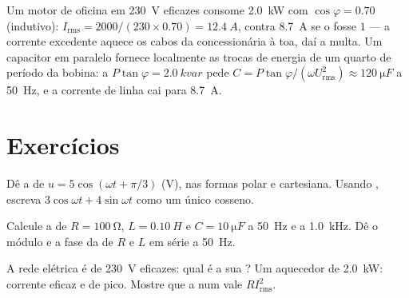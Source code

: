 \begin{example}\label{ex:b1:sinusoidal-impedance:pf}
Um motor de oficina em \qty{230}{V} eficazes consome \qty{2.0}{kW} com
$\cos\varphi = 0.70$ (indutivo): $I_{\mathrm{rms}} = 2000/(230 \times
0.70) = \qty{12.4}{A}$, contra \qty{8.7}{A} se o  fosse
$1$ --- a corrente excedente aquece os cabos da concessionária à toa, daí
a multa. Um capacitor em paralelo fornece localmente as trocas de energia
de um quarto de período da bobina: a \emph{} $P\tan\varphi =
\qty{2.0}{kvar}$ pede $C = P\tan\varphi/(\omega U_{\mathrm{rms}}^2)
\approx \qty{120}{\micro F}$ a \qty{50}{Hz}, e a corrente de linha cai
para \qty{8.7}{A}.
\end{example}

\section{Exercícios}

\begin{exercise}[$\star$]\label{exo:b1:sinusoidal-impedance:1}
Dê a  de $u = 5\cos(\omega t + \pi/3)$ (V), nas formas
polar e cartesiana. Usando , escreva $3\cos\omega t
+ 4\sin\omega t$ como um único cosseno.
\end{exercise}

\begin{exercise}[$\star$]\label{exo:b1:sinusoidal-impedance:2}
Calcule a  de $R = \qty{100}{\ohm}$, $L = \qty{0.10}{H}$ e
$C = \qty{10}{\micro F}$ a \qty{50}{Hz} e a \qty{1.0}{kHz}. Dê o
módulo e a fase da  de $R$ e $L$ em série a
\qty{50}{Hz}.
\end{exercise}

\begin{exercise}[$\star$]\label{exo:b1:sinusoidal-impedance:3}
A rede elétrica é de \qty{230}{V} eficazes: qual é a sua ? Um aquecedor de \qty{2.0}{kW}:
corrente eficaz e de pico. Mostre que a  num 
vale $RI_{\mathrm{rms}}^2$.
\end{exercise}

